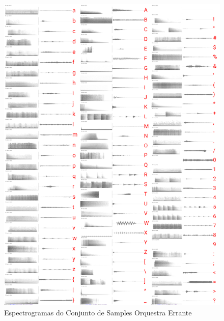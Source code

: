 \begin{figure}
    \caption{\label{samplesorquestra}Espectrogramas do Conjunto de Samples Orquestra Errante}
    \begin{center}
        \includegraphics[width=1\linewidth]{pictures/cap3/bandaorquestra.jpg}
    \end{center}
\end{figure}

